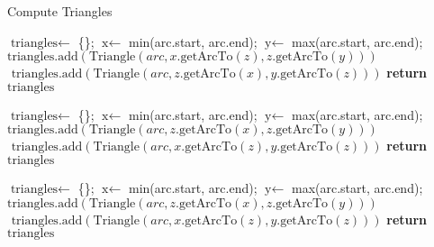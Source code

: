 \documentclass[11pt, rgb]{scrreprt}
\begin{document}
\begin{algorithm}
\caption{Compute Triangles}
\begin{algorithmic}[1]

\State $\text{triangles} \gets$ \{\}; 
$\text{x} \gets$ min(arc.start, arc.end);
$\text{y} \gets$ max(arc.start, arc.end);
             $\text{triangles.add}(\text{Triangle}(arc, x.\text{getArcTo}(z), z.\text{getArcTo}(y)))$
        \Else  $\text{ triangles.add}(\text{Triangle}(arc, z.\text{getArcTo}(x), y.\text{getArcTo}(z)))$
        \EndIf
    \EndIf
\EndFor
\State \textbf{return} $\text{triangles}$
\EndProcedure

\State $\text{triangles} \gets$ \{\};
$\text{x} \gets$ min(arc.start, arc.end);
$\text{y} \gets$ max(arc.start, arc.end);
             $\text{triangles.add}(\text{Triangle}(arc, z.\text{getArcTo}(x), z.\text{getArcTo}(y)))$
        \Else  $\text{ triangles.add}(\text{Triangle}(arc, x.\text{getArcTo}(z), y.\text{getArcTo}(z)))$
        \EndIf
    \EndIf
\EndFor
\State \textbf{return} $\text{triangles}$
\EndProcedure

\State $\text{triangles} \gets$ \{\};
$\text{x} \gets$ min(arc.start, arc.end);
$\text{y} \gets$ max(arc.start, arc.end);
             $\text{triangles.add}(\text{Triangle}(arc, z.\text{getArcTo}(x), z.\text{getArcTo}(y)))$
        \Else  $\text{ triangles.add}(\text{Triangle}(arc, x.\text{getArcTo}(z), y.\text{getArcTo}(z)))$
        \EndIf
    \EndIf
\EndFor
\State \textbf{return} $\text{triangles}$
\EndProcedure

\end{algorithmic}
\end{algorithm}





\end{document}
